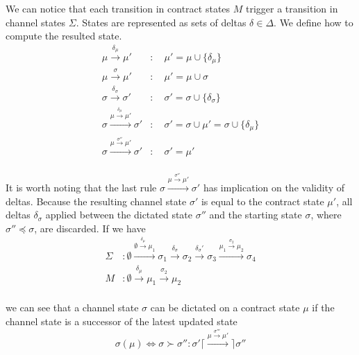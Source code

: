\documentclass{llncs}
\begin{document}
We can notice that each transition in contract states $M$ trigger a transition in channel states $\Sigma$. States are represented as sets of deltas $\delta \in \Delta$. We define how to compute the resulted state.
\begin{equation*}
\begin{split}
    \mu \xrightarrow{\delta_\mu} \mu' &: \quad \mu' = \mu \cup \{\delta_\mu\} \\
    \mu \xrightarrow{\sigma} \mu' &: \quad \mu' = \mu \cup \sigma \\
    \sigma \xrightarrow{\delta_\sigma} \sigma' &: \quad \sigma' = \sigma \cup \{ \delta_\sigma \}  \\
    \sigma \xrightarrow{\mu \xrightarrow{\delta_\mu} \mu'} \sigma' &: \quad \sigma' =  \sigma \cup \mu' = \sigma \cup \{ \delta_\mu \} \\
    \sigma \xrightarrow{\mu \xrightarrow{\sigma''} \mu'} \sigma' &: \quad \sigma' = \mu' \\
\end{split}
\end{equation*}

It is worth noting that the last rule $\sigma \xrightarrow{\mu \xrightarrow{\sigma''} \mu'} \sigma'$ has implication on the validity of deltas. Because the resulting channel state $\sigma'$ is equal to the contract state $\mu'$, all deltas $\delta_\sigma$ applied between the dictated state $\sigma''$ and the starting state $\sigma$, where $\sigma'' \preceq \sigma$, are discarded. If we have
\begin{equation*}
\begin{split}
    \Sigma&: \emptyset \xrightarrow{\emptyset \xrightarrow{\delta_\mu} \mu_1} \sigma_1 \xrightarrow{\delta_\sigma} \sigma_2 \xrightarrow{\delta_\sigma'} \sigma_3 \xrightarrow{\mu_1 \xrightarrow{\sigma_2} \mu_2} \sigma_4\\
    M&: \emptyset \xrightarrow{\delta_\mu} \mu_1 \xrightarrow{\sigma_2} \mu_2 \\
\end{split}
\end{equation*}

we can see that a channel state $\sigma$ can be dictated on a contract state $\mu$ if the channel state is a successor of the latest updated state
$$\sigma(\mu) \iff \sigma \succ \sigma'' : \sigma' \lceil \xrightarrow{\mu \xrightarrow{\sigma'''} \mu'} \rceil \sigma''$$

\end{document}
